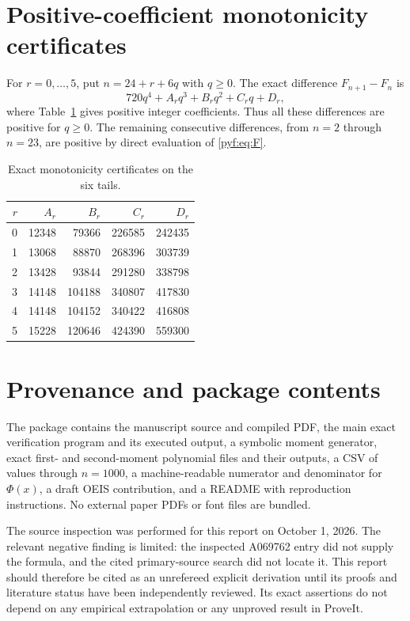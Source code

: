 \documentclass[11pt,a4paper]{article}
\numberwithin{equation}{section}
\theoremstyle{definition}
\begin{document}
\section{Positive-coefficient monotonicity certificates}\label{pyf:app:monotone}

For $r=0,\ldots,5$, put $n=24+r+6q$ with $q\geq0$.
The exact difference $F_{n+1}-F_n$ is
\[
720q^4+A_rq^3+B_rq^2+C_rq+D_r,
\]
where Table~\ref{pyf:tab:monotone} gives positive integer coefficients.
Thus all these differences are positive for $q\geq0$.
The remaining consecutive differences, from $n=2$ through $n=23$,
are positive by direct evaluation of \eqref{pyf:eq:F}.

\begin{table}[ht]
\centering
\caption{Exact monotonicity certificates on the six tails.}\label{pyf:tab:monotone}
\begin{tabular}{rrrrr}
\toprule
$r$ & $A_r$ & $B_r$ & $C_r$ & $D_r$\\
\midrule
0 & 12348 & 79366 & 226585 & 242435\\
1 & 13068 & 88870 & 268396 & 303739\\
2 & 13428 & 93844 & 291280 & 338798\\
3 & 14148 & 104188 & 340807 & 417830\\
4 & 14148 & 104152 & 340422 & 416808\\
5 & 15228 & 120646 & 424390 & 559300\\
\bottomrule
\end{tabular}
\end{table}

\section{Provenance and package contents}\label{pyf:app:package}

The package contains the manuscript source and compiled PDF, the main exact
verification program and its executed output, a symbolic moment generator,
exact first- and second-moment polynomial files and their outputs, a CSV of
values through $n=1000$, a machine-readable numerator and denominator for
$\Phi(x)$, a draft OEIS contribution, and a README with reproduction
instructions. No external paper PDFs or font files are bundled.

The source inspection was performed for this report on October 1, 2026.
The relevant negative finding is limited: the inspected A069762 entry did
not supply the formula, and the cited primary-source search did not locate
it. This report should therefore be cited as an unrefereed explicit
derivation until its proofs and literature status have been independently
reviewed. Its exact assertions do not depend on any empirical extrapolation
or any unproved result in ProveIt.
\end{document}
